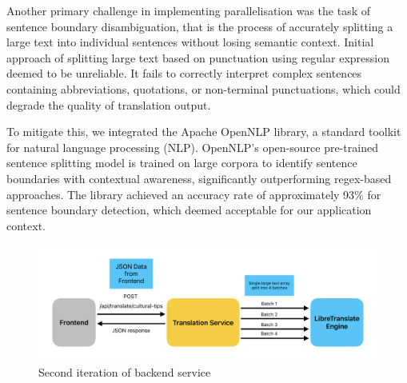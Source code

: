 Another primary challenge in implementing parallelisation was the task of sentence boundary disambiguation, that is the process of accurately splitting a large text into individual sentences without losing semantic context. Initial approach of splitting large text based on punctuation using regular expression deemed to be unreliable. It fails to correctly interpret complex sentences containing abbreviations, quotations, or non-terminal punctuations, which could degrade the quality of translation output\cite{walker_et_al_2001}.

To mitigate this, we integrated the Apache OpenNLP library, a standard toolkit for natural language processing (NLP). OpenNLP's open-source pre-trained sentence splitting model\cite{apache_opennlp_models} is trained on large corpora to identify sentence boundaries with contextual awareness, significantly outperforming regex-based approaches. The library achieved an accuracy rate of approximately 93\% for sentence boundary detection, which deemed acceptable for our application context\cite{apache_opennlp_manual_2_3_2}.

\begin{figure}[H]
    \centering
    \includegraphics[width=1\linewidth]{chapter/05_implementation/backend/B_architectural_design/Backend_Iteration_2.pdf}
    \caption{Second iteration of backend service}
    \label{fig:backend_iteration_2}
\end{figure}

